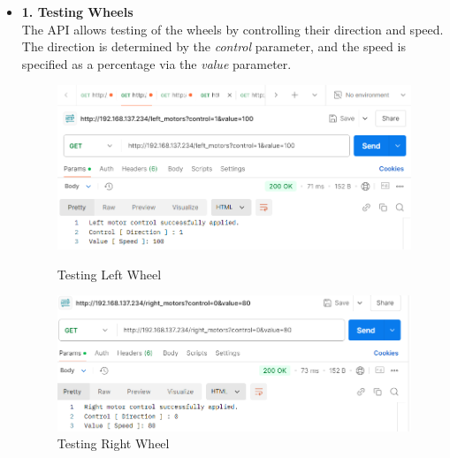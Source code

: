 \documentclass[12pt,a4paper]{report}
\begin{document}
\begin{enumerate}
\begin{itemize}
    \item \textbf{1. Testing Wheels}
    \\ The API allows testing of the wheels by controlling their direction and speed. The direction is determined by the \textit{control} parameter, and the speed is specified as a percentage via the \textit{value} parameter.
    \begin{figure}[H]
        \centering
        \begin{minipage}{0.45\textwidth}
            \centering
            \includegraphics[width=\textwidth]{wheelTest1}  %
            \caption{Testing Left Wheel}
            \label{fig:wheelTest1}
        \end{minipage} \hfill
        \begin{minipage}{0.45\textwidth}
            \centering
            \includegraphics[width=\textwidth]{wheelTest2}  %
            \caption{Testing Right Wheel}
            \label{fig:wheelTest2}
        \end{minipage}
    \end{figure}


\end{itemize}
\end{enumerate}
\end{document}
